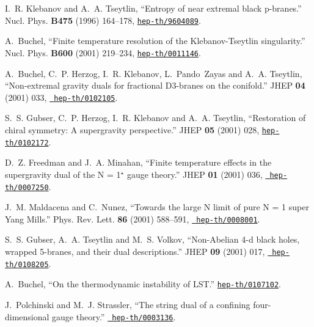 \documentclass[a4paper,11pt]{article}
\begin{document}
\begin{thebibliography}{10}
I.~R. Klebanov and A.~A. Tseytlin, ``Entropy of near extremal black p-branes.''
  Nucl. Phys. {\bf B475} (1996) 164--178,
  \href{http://xxx.lanl.gov/abs/hep-th/9604089}{{\tt hep-th/9604089}}.

A.~Buchel, ``Finite temperature resolution of the Klebanov-Tseytlin
  singularity.'' Nucl. Phys. {\bf B600} (2001) 219--234,
  \href{http://xxx.lanl.gov/abs/hep-th/0011146}{{\tt hep-th/0011146}}.

A.~Buchel, C.~P. Herzog, I.~R. Klebanov, L.~Pando~Zayas and A.~A. Tseytlin,
  ``Non-extremal gravity duals for fractional D3-branes on the conifold.'' JHEP
  {\bf 04} (2001) 033, \href{http://xxx.lanl.gov/abs/hep-th/0102105}{{\tt
  hep-th/0102105}}. %

S.~S. Gubser, C.~P. Herzog, I.~R. Klebanov and A.~A. Tseytlin, ``Restoration of
  chiral symmetry: A supergravity perspective.'' JHEP {\bf 05} (2001) 028,
  \href{http://xxx.lanl.gov/abs/hep-th/0102172}{{\tt hep-th/0102172}}.

D.~Z. Freedman and J.~A. Minahan, ``Finite temperature effects in the
  supergravity dual of the {N = 1${}^\star$} gauge theory.'' JHEP {\bf 01}
  (2001) 036,
  \href{http://xxx.lanl.gov/abs/http://arXiv.org/abs/hep-th/0007250}{{\tt
  hep-th/0007250}}. %

J.~M. Maldacena and C.~Nunez, ``Towards the large N limit of pure N = 1 super
  Yang Mills.'' Phys. Rev. Lett. {\bf 86} (2001) 588--591,
  \href{http://xxx.lanl.gov/abs/http://arXiv.org/abs/hep-th/0008001}{{\tt
  hep-th/0008001}}. %

S.~S. Gubser, A.~A. Tseytlin and M.~S. Volkov, ``Non-Abelian 4-d black holes,
  wrapped 5-branes, and their dual descriptions.'' JHEP {\bf 09} (2001) 017,
  \href{http://xxx.lanl.gov/abs/http://arXiv.org/abs/hep-th/0108205}{{\tt
  hep-th/0108205}}. %

A.~Buchel, ``On the thermodynamic instability of {LST}.''
  \href{http://xxx.lanl.gov/abs/hep-th/0107102}{{\tt hep-th/0107102}}.

J.~Polchinski and M.~J. Strassler, ``The string dual of a confining
  four-dimensional gauge theory.''
  \href{http://xxx.lanl.gov/abs/http://arXiv.org/abs/hep-th/0003136}{{\tt
  hep-th/0003136}}. %


\end{thebibliography}
\end{document}
